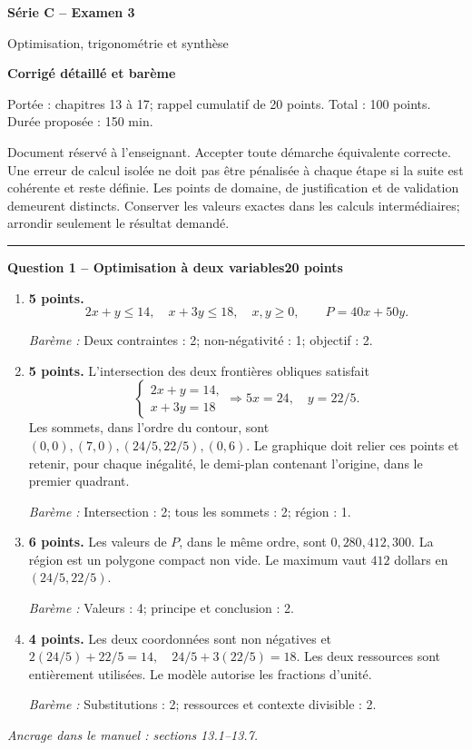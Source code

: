 \documentclass[11pt,a4paper]{article}
\begin{document}
{\LARGE\bfseries Série C -- Examen 3}\par
{\large Optimisation, trigonométrie et synthèse}\par
\textbf{Corrigé détaillé et barème}\par
Portée : chapitres 13 à 17; rappel cumulatif de 20 points. Total : 100 points. Durée proposée : 150 min.\par
\small Document réservé à l’enseignant. Accepter toute démarche équivalente correcte. Une erreur de calcul isolée ne doit pas être pénalisée à chaque étape si la suite est cohérente et reste définie. Les points de domaine, de justification et de validation demeurent distincts. Conserver les valeurs exactes dans les calculs intermédiaires; arrondir seulement le résultat demandé.\normalsize\par
\vspace{3mm}\hrule\vspace{4mm}
{\large\bfseries Question 1 -- Optimisation à deux variables}\hfill\textbf{20 points}\par
\begin{enumerate}
\item \textbf{5 points.} \[2x+y\le 14,\quad x+3y\le 18,\quad x,y\ge0,\qquad P=40x+50y.\]
\par{\small\textit{Barème : }Deux contraintes : 2; non-négativité : 1; objectif : 2.}
\item \textbf{5 points.} L’intersection des deux frontières obliques satisfait \[\begin{cases}2x+y=14,\\x+3y=18\end{cases}\Longrightarrow5x=24,\quad y=22/5.\] Les sommets, dans l’ordre du contour, sont \((0,0),(7,0),(24/5,22/5),(0,6)\). Le graphique doit relier ces points et retenir, pour chaque inégalité, le demi-plan contenant l’origine, dans le premier quadrant.
\par{\small\textit{Barème : }Intersection : 2; tous les sommets : 2; région : 1.}
\item \textbf{6 points.} Les valeurs de \(P\), dans le même ordre, sont \(0,280,412,300\). La région est un polygone compact non vide. Le maximum vaut \(412\) dollars en \((24/5,22/5)\).
\par{\small\textit{Barème : }Valeurs : 4; principe et conclusion : 2.}
\item \textbf{4 points.} Les deux coordonnées sont non négatives et \(2(24/5)+22/5=14,\quad24/5+3(22/5)=18\). Les deux ressources sont entièrement utilisées. Le modèle autorise les fractions d’unité.
\par{\small\textit{Barème : }Substitutions : 2; ressources et contexte divisible : 2.}
\end{enumerate}
\vfill {\small\textit{Ancrage dans le manuel : sections 13.1--13.7.}}
\end{document}
